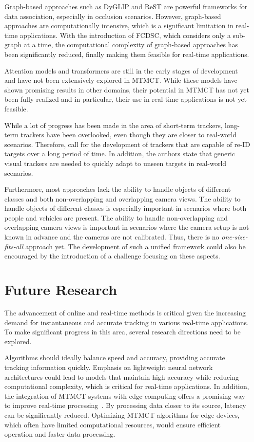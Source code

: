Graph-based approaches such as DyGLIP and ReST are powerful frameworks for data association, especially in occlusion scenarios. However, graph-based approaches are computationally intensive, which is a significant limitation in real-time applications. With the introduction of FCDSC, which considers only a sub-graph at a time, the computational complexity of graph-based approaches has been significantly reduced, finally making them feasible for real-time applications.

Attention models and transformers are still in the early stages of development and have not been extensively explored in MTMCT. While these models have shown promising results in other domains, their potential in MTMCT has not yet been fully realized and in particular, their use in real-time applications is not yet feasible.

While a lot of progress has been made in the area of short-term trackers, long-term trackers have been overlooked, even though they are closer to real-world scenarios. Therefore, \textcite{Zadeh21} call for the development of trackers that are capable of re-ID targets over a long period of time. In addition, the authors state that generic visual trackers are needed to quickly adapt to unseen targets in real-world scenarios.

Furthermore, most approaches lack the ability to handle objects of different classes and both non-overlapping and overlapping camera views. The ability to handle objects of different classes is especially important in scenarios where both people and vehicles are present. The ability to handle non-overlapping and overlapping camera views is important in scenarios where the camera setup is not known in advance and the cameras are not calibrated. Thus, there is no \textit{one-size-fits-all} approach yet. The development of such a unified framework could also be encouraged by the introduction of a challenge focusing on these aspects.

\section{Future Research}\label{sec:future_research}
The advancement of online and real-time methods is critical given the increasing demand for instantaneous and accurate tracking in various real-time applications. To make significant progress in this area, several research directions need to be explored.

Algorithms should ideally balance speed and accuracy, providing accurate tracking information quickly. Emphasis on lightweight neural network architectures could lead to models that maintain high accuracy while reducing computational complexity, which is critical for real-time applications. In addition, the integration of MTMCT systems with edge computing offers a promising way to improve real-time processing~\cite{Yu17}. By processing data closer to its source, latency can be significantly reduced. Optimizing MTMCT algorithms for edge devices, which often have limited computational resources, would ensure efficient operation and faster data processing.

